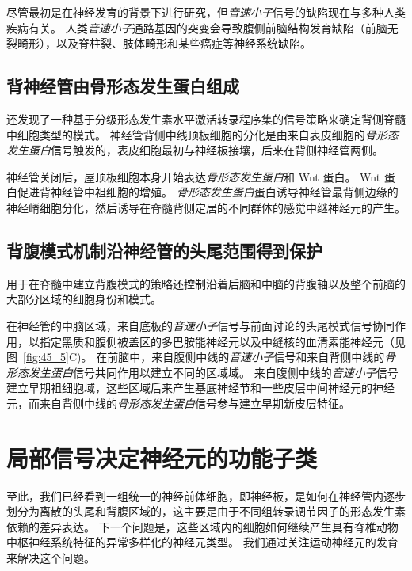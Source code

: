 尽管最初是在神经发育的背景下进行研究，但\textit{音速小子}信号的缺陷现在与多种人类疾病有关。
人类\textit{音速小子}通路基因的突变会导致腹侧前脑结构发育缺陷（前脑无裂畸形），以及脊柱裂、肢体畸形和某些癌症等神经系统缺陷。



\subsection{背神经管由骨形态发生蛋白组成}

还发现了一种基于分级形态发生素水平激活转录程序集的信号策略来确定背侧脊髓中细胞类型的模式。
神经管背侧中线顶板细胞的分化是由来自表皮细胞的\textit{骨形态发生蛋白}信号触发的，表皮细胞最初与神经板接壤，后来在背侧神经管两侧。


神经管关闭后，屋顶板细胞本身开始表达\textit{骨形态发生蛋白}和 Wnt 蛋白。
Wnt 蛋白促进背神经管中祖细胞的增殖。
\textit{骨形态发生蛋白}蛋白诱导神经管最背侧边缘的神经嵴细胞分化，然后诱导在脊髓背侧定居的不同群体的感觉中继神经元的产生。



\subsection{背腹模式机制沿神经管的头尾范围得到保护}

用于在脊髓中建立背腹模式的策略还控制沿着后脑和中脑的背腹轴以及整个前脑的大部分区域的细胞身份和模式。


在神经管的中脑区域，来自底板的\textit{音速小子}信号与前面讨论的头尾模式信号协同作用，以指定黑质和腹侧被盖区的多巴胺能神经元以及中缝核的血清素能神经元（见图~\ref{fig:45_5}C)。
在前脑中，来自腹侧中线的\textit{音速小子}信号和来自背侧中线的\textit{骨形态发生蛋白}信号共同作用以建立不同的区域域。
来自腹侧中线的\textit{音速小子}信号建立早期祖细胞域，这些区域后来产生基底神经节和一些皮层中间神经元的神经元，而来自背侧中线的\textit{骨形态发生蛋白}信号参与建立早期新皮层特征。



\section{局部信号决定神经元的功能子类}

至此，我们已经看到一组统一的神经前体细胞，即神经板，是如何在神经管内逐步划分为离散的头尾和背腹区域的，这主要是由于不同组转录调节因子的形态发生素依赖的差异表达。
下一个问题是，这些区域内的细胞如何继续产生具有脊椎动物中枢神经系统特征的异常多样化的神经元类型。
我们通过关注运动神经元的发育来解决这个问题。


